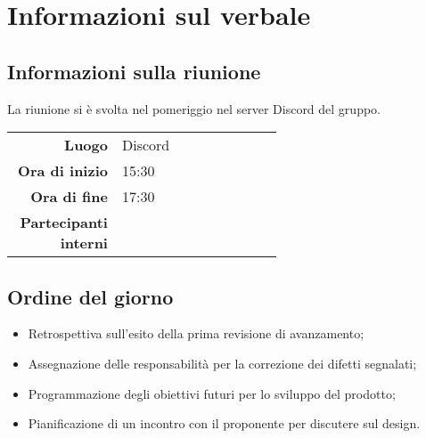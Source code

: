\section{Informazioni sul verbale}

\subsection{Informazioni sulla riunione}
La riunione si è svolta nel pomeriggio nel server Discord del gruppo.

\begin{center}
	\begin{tabular}{r|p{0.6\linewidth}}
		\toprule
		\textbf{Luogo} & Discord \\
		\textbf{Ora di inizio} & 15:30 \\
		\textbf{Ora di fine} & 17:30 \\
		\textbf{Partecipanti interni} & \groupTeam
	\end{tabular}
\end{center}

\medskip

\subsection{Ordine del giorno}
\begin{itemize}
	\item Retrospettiva sull'esito della prima revisione di avanzamento;
	\item Assegnazione delle responsabilità per la correzione dei difetti segnalati;
	\item Programmazione degli obiettivi futuri per lo sviluppo del prodotto;
	\item Pianificazione di un incontro con il proponente per discutere sul design.
\end{itemize}